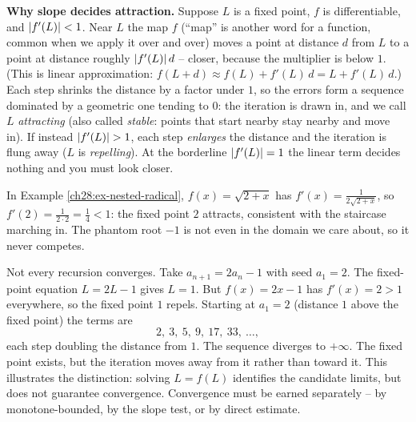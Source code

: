 \begin{whybox}
\textbf{Why slope decides attraction.} Suppose $L$ is a fixed point, $f$ is
differentiable, and $\lvert f'(L)\rvert < 1$. Near $L$ the map $f$ (``map'' is another
word for a function, common when we apply it over and over) moves a point at distance
$d$ from $L$ to a point at distance roughly $\lvert f'(L)\rvert\,d$ -- closer, because
the multiplier is below $1$. (This is linear approximation:
$f(L + d) \approx f(L) + f'(L)\,d = L + f'(L)\,d$.) Each step shrinks the distance by a factor under
$1$, so the errors form a sequence dominated by a geometric one tending to $0$:
the iteration is drawn in, and we call $L$ \emph{attracting} (also called
\emph{stable}: points that start nearby stay nearby and move in). If instead
$\lvert f'(L)\rvert > 1$, each step \emph{enlarges} the distance and the iteration is
flung away ($L$ is \emph{repelling}). At the borderline $\lvert f'(L)\rvert = 1$ the
linear term decides nothing and you must look closer.

In Example \ref{ch28:ex-nested-radical}, $f(x) = \sqrt{2+x}$ has $f'(x) =
\tfrac{1}{2\sqrt{2+x}}$, so $f'(2) = \tfrac{1}{2\cdot 2} = \tfrac14 < 1$: the
fixed point $2$ attracts, consistent with the staircase marching in. The phantom
root $-1$ is not even in the domain we care about, so it never competes.
\end{whybox}

\begin{example}
\label{ch28:ex-divergent-recursion}
Not every recursion converges. Take $a_{n+1} = 2a_n - 1$ with seed $a_1 = 2$. The
fixed-point equation $L = 2L - 1$ gives $L = 1$. But $f(x) = 2x - 1$ has $f'(x) =
2 > 1$ everywhere, so the fixed point $1$ repels. Starting at $a_1 = 2$ (distance
$1$ above the fixed point) the terms are
\[
  2,\ 3,\ 5,\ 9,\ 17,\ 33,\ \dots,
\]
each step doubling the distance from $1$. The sequence diverges to $+\infty$. The
fixed point exists, but the iteration moves away from it rather than toward it.
This illustrates the distinction: solving $L = f(L)$ identifies the candidate
limits, but does not guarantee convergence. Convergence
must be earned separately -- by monotone-bounded, by the slope test, or by direct
estimate.
\end{example}

